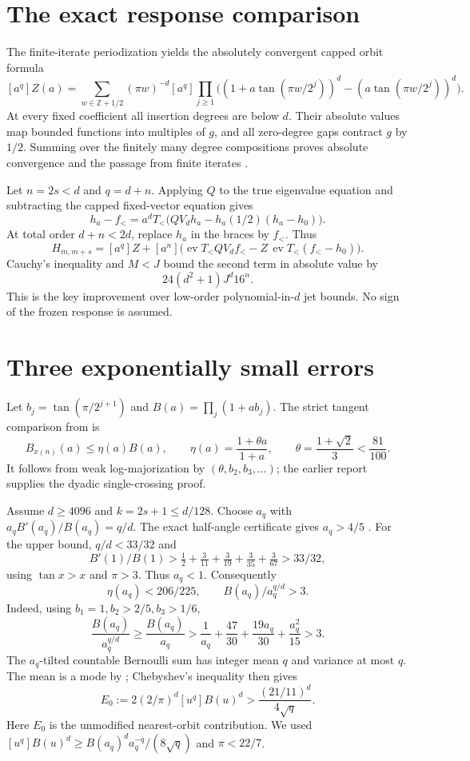 \documentclass[11pt,a4paper]{article}
\theoremstyle{remark}\newtheorem*{ednote}{Editorial note (ProveIt, 2026-10-01)}
\newcommand{\ev}{\operatorname{ev}}\newcommand{\Z}{\mathbb Z}
\begin{document}
\section{The exact response comparison}
The finite-iterate periodization yields the absolutely convergent capped orbit formula
\begin{equation}\label{eq:orbit}
[a^q]Z(a)=\sum_{w\in\Z+1/2}(\pi w)^{-d}
[a^q]\prod_{j\ge1}\bigl((1+a\tan(\pi w/2^j))^d-(a\tan(\pi w/2^j))^d\bigr).
\end{equation}
At every fixed coefficient all insertion degrees are below $d$. Their absolute values map bounded functions into multiples of $g$, and all zero-degree gaps contract $g$ by $1/2$. Summing over the finitely many degree compositions proves absolute convergence and the passage from finite iterates \cite{offset}.

Let $n=2s<d$ and $q=d+n$. Applying $Q$ to the true eigenvalue equation and subtracting the capped fixed-vector equation gives
\[
h_a-f_{<}=a^dT_{<}\bigl(QV_dh_a-h_a(1/2)(h_a-h_0)\bigr).
\]
At total order $d+n<2d$, replace $h_a$ in the braces by $f_{<}$. Thus
\begin{equation}\label{eq:restore}
H_{m,m+s}=[a^q]Z+[a^n]\bigl(\ev T_{<}QV_df_{<}-Z\,\ev T_{<}(f_{<}-h_0)\bigr).
\end{equation}
Cauchy's inequality and $M<J$ bound the second term in absolute value by
\begin{equation}\label{eq:restorebound}
24(d^2+1)J^d16^n.
\end{equation}
This is the key improvement over low-order polynomial-in-$d$ jet bounds. No sign of the frozen response is assumed.

\section{Three exponentially small errors}
Let $b_j=\tan(\pi/2^{j+1})$ and $B(a)=\prod_j(1+ab_j)$. The strict tangent comparison from \cite{boundary} is
\[
B_{x(n)}(a)\le\eta(a)B(a),\qquad\eta(a)=\frac{1+\theta a}{1+a},\qquad\theta=\frac{1+\sqrt2}{3}<\frac{81}{100}.
\]
It follows from weak log-majorization by $(\theta,b_2,b_3,\ldots)$; the earlier report supplies the dyadic single-crossing proof.

Assume $d\ge4096$ and $k=2s+1\le d/128$. Choose $a_q$ with $a_qB'(a_q)/B(a_q)=q/d$. The exact half-angle certificate gives $a_q>4/5$ \cite{boundary}. For the upper bound, $q/d<33/32$ and
\[
B'(1)/B(1)>\tfrac12+\tfrac3{11}+\tfrac3{19}+\tfrac3{35}+\tfrac3{67}>33/32,
\]
using $\tan x>x$ and $\pi>3$. Thus $a_q<1$. Consequently
\[
\eta(a_q)<206/225,\qquad B(a_q)/a_q^{q/d}>3.
\]
Indeed, using $b_1=1,b_2>2/5,b_3>1/6$,
\[
\frac{B(a_q)}{a_q^{q/d}}\ge\frac{B(a_q)}{a_q}
>\frac1{a_q}+\frac{47}{30}+\frac{19a_q}{30}+\frac{a_q^2}{15}>3.
\] The $a_q$-tilted countable Bernoulli sum has integer mean $q$ and variance at most $q$. The mean is a mode by \cite[Theorem 2]{gnedin}; Chebyshev's inequality then gives
\begin{equation}\label{eq:mainlower}
E_0:=2(2/\pi)^d[u^q]B(u)^d>\frac{(21/11)^d}{4\sqrt q}.
\end{equation}
Here $E_0$ is the unmodified nearest-orbit contribution. We used $[u^q]B(u)^d\ge B(a_q)^da_q^{-q}/(8\sqrt q)$ and $\pi<22/7$.
\end{document}

